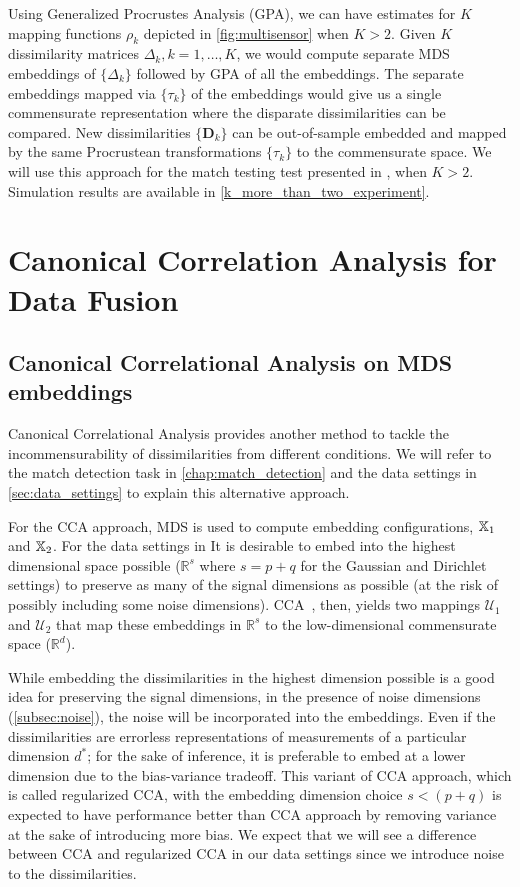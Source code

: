 \documentclass[12pt,oneside,final]{thesis}\usepackage[]{graphicx}\usepackage[]{color}
\begin{document}
Using Generalized Procrustes Analysis (GPA), we can have estimates for $K$ mapping functions $\rho_k$ depicted in \ref{fig:multisensor} when $K>2$. Given $K$  dissimilarity matrices $\Delta_k,k=1,\ldots,K$,  we would compute separate  MDS embeddings of  $\{\Delta_k \}$  followed by GPA of all the embeddings. The separate embeddings mapped via $\{\tau_k \}$ of the embeddings would give us a single commensurate representation where the disparate dissimilarities can be compared. New dissimilarities $\{ \bm{D}_k \}$ can be out-of-sample embedded  and mapped by the same Procrustean transformations  $\{\tau_k \}$ to the commensurate space. We will use this approach  for the match testing test presented in \label{sec:match detection}, when $K>2$. Simulation results are available in \ref{k_more_than_two_experiment}.






\chapter{Canonical Correlation Analysis for Data Fusion}
\label{chap:CCA}

\section{Canonical Correlational Analysis on MDS embeddings\label{sec:CCA}}

Canonical Correlational Analysis provides another method to tackle the incommensurability of dissimilarities from different conditions. We will refer to the match detection task in \autoref{chap:match_detection} and the data settings in \autoref{sec:data_settings} to explain this alternative approach.

For the CCA approach, MDS is used  to compute embedding configurations, $ \mathbb{X}_1$ and $\mathbb{X}_2$. For the data settings in  It is desirable to  embed into the highest dimensional space  possible ($\mathbb{R}^{s}$ where $s=p+q$ for the Gaussian and Dirichlet settings)  to  preserve as many of the signal dimensions as possible (at the risk of possibly including  some noise dimensions). CCA~\cite{Hardoon2004}, then,  yields two mappings $\mathcal{U}_1$ and $\mathcal{U}_2$ that map these embeddings in $\mathbb{R}^{s}$ to  the low-dimensional commensurate space ($\mathbb{R}^d$). 

While embedding the dissimilarities in the  highest dimension possible is a good idea for preserving the signal dimensions, in the presence of noise dimensions (\ref{subsec:noise}), the noise will be incorporated into the embeddings. Even if the dissimilarities are errorless representations of measurements of a particular dimension $d^*$; for  the  sake of inference, it is preferable to embed at a lower  dimension due to the bias-variance tradeoff. This variant of CCA approach, which is called regularized CCA, with the  embedding dimension choice $s< (p+q)$ is expected to have performance better than CCA approach by removing variance at the sake of introducing more bias. We expect that  we will see a difference between CCA and regularized CCA  in our data settings since we introduce noise to the dissimilarities.
\end{document}
